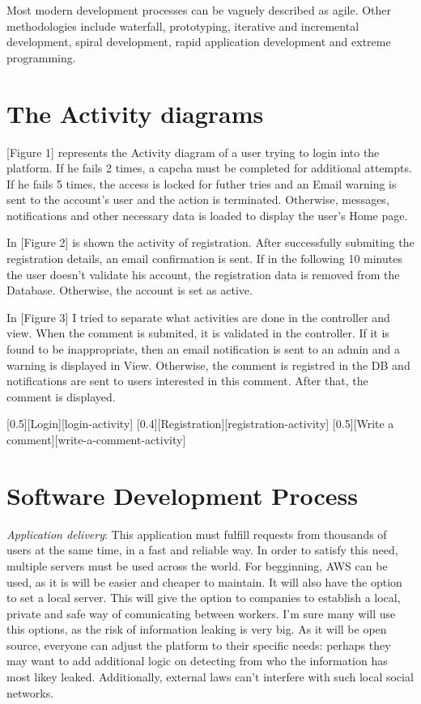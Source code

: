 \documentclass{article}
\begin{document}
			Most modern development processes can be vaguely described as agile. Other methodologies include waterfall, prototyping, iterative and incremental development, spiral development, rapid application development and extreme programming.

	\section{The Activity diagrams}
		[Figure 1] represents the Activity diagram of a user trying to login into the platform. If he fails 2 times, a capcha must be completed for additional attempts. If he fails 5 times, the access is locked for futher tries and an Email warning is sent to the account's user and the action is terminated. Otherwise, messages, notifications and other necessary data is loaded to display the user's Home page.

		\bigskip
		In [Figure 2] is shown the activity of registration. After successfully submiting the registration details, an email confirmation is sent. If in the following 10 minutes the user doesn't validate his account, the registration data is removed from the Database. Otherwise, the account is set as active.

		\bigskip
		In [Figure 3] I tried to separate what activities are done in the controller and view. When the comment is submited, it is validated in the controller. If it is found to be inappropriate, then an email notification is sent to an admin and a warning is displayed in View. Otherwise, the comment is registred in the DB and notifications are sent to users interested in this comment. After that, the comment is displayed.

		[0.5][Login][login-activity]
		[0.4][Registration][registration-activity]
		[0.5][Write a comment][write-a-comment-activity]


	\section{Software Development Process}
		\textit{Application delivery}: This application must fulfill requests from thousands of users at the same time, in a fast and reliable way. In order to satisfy this need, multiple servers must be used across the world. For begginning, AWS can be used, as it is will be easier and cheaper to maintain. It will also have the option to set a local server. This will give the option to companies to establish a local, private and safe way of comunicating between workers. I'm sure many will use this options, as the risk of information leaking is very big. As it will be open source, everyone can adjust the platform to their specific needs: perhaps they may want to add additional logic on detecting from who the information has most likey leaked. Additionally, external laws can't interfere with such local social networks.
\end{document}
